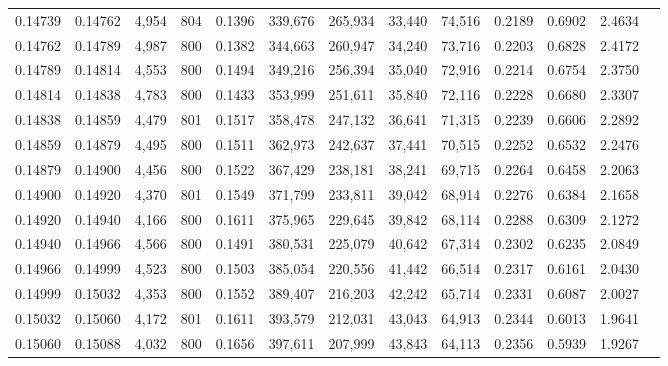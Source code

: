 \begin{tabular}{rrrrrrrrrrrrr}
0.14739 & 0.14762 &  4,954 & 804 &                                     0.1396 & 339,676 & 265,934 &  33,440 &  74,516 & 0.2189 & 0.6902 & 2.4634 \\
0.14762 & 0.14789 &  4,987 & 800 &                                     0.1382 & 344,663 & 260,947 &  34,240 &  73,716 & 0.2203 & 0.6828 & 2.4172 \\
0.14789 & 0.14814 &  4,553 & 800 &                                     0.1494 & 349,216 & 256,394 &  35,040 &  72,916 & 0.2214 & 0.6754 & 2.3750 \\
0.14814 & 0.14838 &  4,783 & 800 &                                     0.1433 & 353,999 & 251,611 &  35,840 &  72,116 & 0.2228 & 0.6680 & 2.3307 \\
0.14838 & 0.14859 &  4,479 & 801 &                                     0.1517 & 358,478 & 247,132 &  36,641 &  71,315 & 0.2239 & 0.6606 & 2.2892 \\
0.14859 & 0.14879 &  4,495 & 800 &                                     0.1511 & 362,973 & 242,637 &  37,441 &  70,515 & 0.2252 & 0.6532 & 2.2476 \\
0.14879 & 0.14900 &  4,456 & 800 &                                     0.1522 & 367,429 & 238,181 &  38,241 &  69,715 & 0.2264 & 0.6458 & 2.2063 \\
0.14900 & 0.14920 &  4,370 & 801 &                                     0.1549 & 371,799 & 233,811 &  39,042 &  68,914 & 0.2276 & 0.6384 & 2.1658 \\
0.14920 & 0.14940 &  4,166 & 800 &                                     0.1611 & 375,965 & 229,645 &  39,842 &  68,114 & 0.2288 & 0.6309 & 2.1272 \\
0.14940 & 0.14966 &  4,566 & 800 &                                     0.1491 & 380,531 & 225,079 &  40,642 &  67,314 & 0.2302 & 0.6235 & 2.0849 \\
0.14966 & 0.14999 &  4,523 & 800 &                                     0.1503 & 385,054 & 220,556 &  41,442 &  66,514 & 0.2317 & 0.6161 & 2.0430 \\
0.14999 & 0.15032 &  4,353 & 800 &                                     0.1552 & 389,407 & 216,203 &  42,242 &  65,714 & 0.2331 & 0.6087 & 2.0027 \\
0.15032 & 0.15060 &  4,172 & 801 &                                     0.1611 & 393,579 & 212,031 &  43,043 &  64,913 & 0.2344 & 0.6013 & 1.9641 \\
0.15060 & 0.15088 &  4,032 & 800 &                                     0.1656 & 397,611 & 207,999 &  43,843 &  64,113 & 0.2356 & 0.5939 & 1.9267 \\

\end{tabular}
